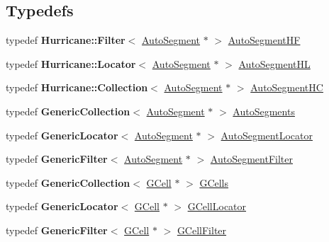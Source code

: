 \subsection*{Typedefs}
\begin{DoxyCompactItemize}
\item 
typedef \textbf{ Hurricane\+::\+Filter}$<$ \mbox{\hyperlink{classKatabatic_1_1AutoSegment}{Auto\+Segment}} $\ast$ $>$ \mbox{\hyperlink{namespaceKatabatic_a790418bb65a9a13859868df3e8f53598}{Auto\+Segment\+HF}}
\item 
typedef \textbf{ Hurricane\+::\+Locator}$<$ \mbox{\hyperlink{classKatabatic_1_1AutoSegment}{Auto\+Segment}} $\ast$ $>$ \mbox{\hyperlink{namespaceKatabatic_a40ef13471fd0e797b75d3c436813fe65}{Auto\+Segment\+HL}}
\item 
typedef \textbf{ Hurricane\+::\+Collection}$<$ \mbox{\hyperlink{classKatabatic_1_1AutoSegment}{Auto\+Segment}} $\ast$ $>$ \mbox{\hyperlink{namespaceKatabatic_acb3628dc7705fefe38a665cfe43efa6e}{Auto\+Segment\+HC}}
\item 
typedef \textbf{ Generic\+Collection}$<$ \mbox{\hyperlink{classKatabatic_1_1AutoSegment}{Auto\+Segment}} $\ast$ $>$ \mbox{\hyperlink{namespaceKatabatic_a2221b0ddbc24f331809fc86f98e38041}{Auto\+Segments}}
\item 
typedef \textbf{ Generic\+Locator}$<$ \mbox{\hyperlink{classKatabatic_1_1AutoSegment}{Auto\+Segment}} $\ast$ $>$ \mbox{\hyperlink{namespaceKatabatic_ace866cc8e09faf80f71a4087bb8e5870}{Auto\+Segment\+Locator}}
\item 
typedef \textbf{ Generic\+Filter}$<$ \mbox{\hyperlink{classKatabatic_1_1AutoSegment}{Auto\+Segment}} $\ast$ $>$ \mbox{\hyperlink{namespaceKatabatic_a13ffc994c98e1a878e61a927de0509c8}{Auto\+Segment\+Filter}}
\item 
typedef \textbf{ Generic\+Collection}$<$ \mbox{\hyperlink{classKatabatic_1_1GCell}{G\+Cell}} $\ast$ $>$ \mbox{\hyperlink{namespaceKatabatic_ab68f9dfbbc79fd999773beef8561bc31}{G\+Cells}}
\item 
typedef \textbf{ Generic\+Locator}$<$ \mbox{\hyperlink{classKatabatic_1_1GCell}{G\+Cell}} $\ast$ $>$ \mbox{\hyperlink{namespaceKatabatic_ae192ef170a0ad390902e435ac1e6796a}{G\+Cell\+Locator}}
\item 
typedef \textbf{ Generic\+Filter}$<$ \mbox{\hyperlink{classKatabatic_1_1GCell}{G\+Cell}} $\ast$ $>$ \mbox{\hyperlink{namespaceKatabatic_a7d07e23d45818a2ae5f6881ce0ec7403}{G\+Cell\+Filter}}
\end{DoxyCompactItemize}

